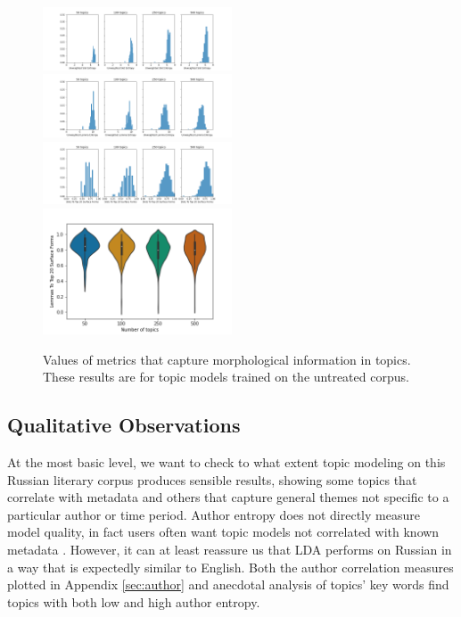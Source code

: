 \documentclass[11pt,a4paper]{article}
\begin{document}
\begin{figure}[t]
    \includegraphics[width=0.5\textwidth]{unweighted_slot_entropy.png}
    \includegraphics[width=0.5\textwidth]{unweighted_lemma_entropy.png}
    \includegraphics[width=0.5\textwidth]{slots_to_top_20_surface_forms.png}
    \includegraphics[width=0.5\textwidth]{lemmas_to_top_20_surface_forms.png}
    \caption{Values of metrics that capture morphological information in topics. These results are for topic models trained on the untreated corpus.}
    \label{fig:slot_lemma_figs}
\end{figure}
\subsection{Qualitative Observations}
At the most basic level, we want to check to what extent topic modeling on this Russian literary corpus produces sensible results, showing some topics that correlate with metadata and others that capture general themes not specific to a particular author or time period. Author entropy does not directly measure model quality, in fact users often want topic models not correlated with known metadata \cite{Thompson2018AuthorlessTM}. However, it can at least reassure us that LDA performs on Russian in a way that is expectedly similar to English. Both the author correlation measures plotted in Appendix \ref{sec:author} and anecdotal analysis of topics' key words find topics with both low and high author entropy.
\end{document}
